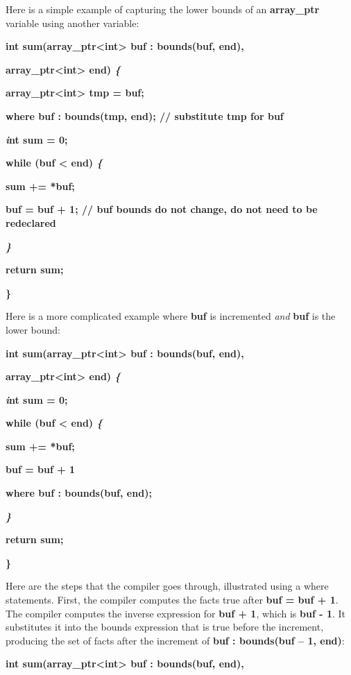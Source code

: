 \documentclass[]{article}
\begin{document}
Here is a simple example of capturing the lower bounds of an
\textbf{array\_ptr} variable using another variable:

\textbf{int sum(array\_ptr\textless{}int\textgreater{} buf : bounds(buf,
end), }

\textbf{array\_ptr\textless{}int\textgreater{} end) \emph{\{}}

\textbf{array\_ptr\textless{}int\textgreater{} tmp = buf;}

\textbf{where buf : bounds(tmp, end); // substitute tmp for buf}

\textbf{\emph{i}nt sum = 0;}

\textbf{while (buf \textless{} end) \emph{\{}}

\textbf{sum += *buf; }

\textbf{buf = buf + 1; // buf bounds do not change, do not need to be
redeclared}

\emph{\textbf{\}}}

\textbf{return sum;}

\textbf{\}}

Here is a more complicated example where \textbf{buf} is incremented
\emph{and} \textbf{buf} is the lower bound:

\textbf{int sum(array\_ptr\textless{}int\textgreater{} buf : bounds(buf,
end), }

\textbf{array\_ptr\textless{}int\textgreater{} end) \emph{\{}}

\textbf{\emph{i}nt sum = 0;}

\textbf{while (buf \textless{} end) \emph{\{}}

\textbf{sum += *buf; }

\textbf{buf = buf + 1}

\textbf{where buf : bounds(buf, end);}

\emph{\textbf{\}}}

\textbf{return sum;}

\textbf{\}}

Here are the steps that the compiler goes through, illustrated using a
where statements. First, the compiler computes the facts true after
\textbf{buf = buf + 1}. The compiler computes the inverse expression for
\textbf{buf + 1}, which is \textbf{buf - 1}. It substitutes it into the
bounds expression that is true before the increment, producing the set
of facts after the increment of \textbf{buf : bounds(buf -- 1, end)}:

\textbf{int sum(array\_ptr\textless{}int\textgreater{} buf : bounds(buf,
end), }
\end{document}
